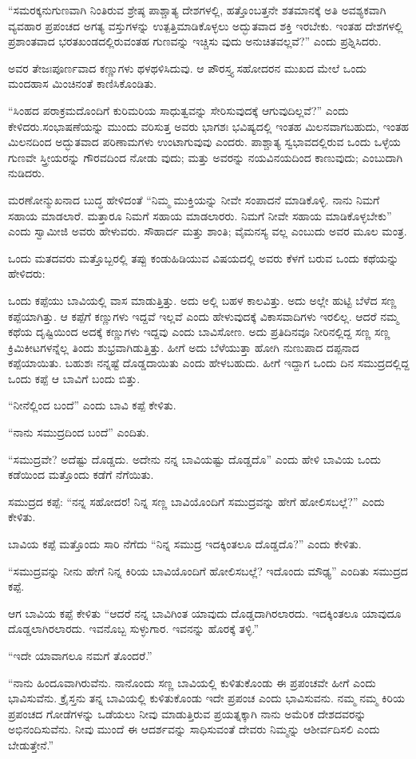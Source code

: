 “ಸಮರಕ್ಕನುಗುಣವಾಗಿ ನಿಂತಿರುವ ಶ್ರೇಷ್ಠ ಪಾಶ್ಚಾತ್ಯ ದೇಶಗಳಲ್ಲಿ, ಹತ್ತೊಂಬತ್ತನೇ ಶತಮಾನಕ್ಕೆ ಅತಿ ಅವಶ್ಯಕವಾಗಿ ವ್ಯವಹಾರ ಪ್ರಪಂಚದ ಅಗತ್ಯ ವಸ್ತುಗಳನ್ನು ಉತ್ಪತ್ತಿಮಾಡಿಕೊಳ್ಳಲು ಅದ್ಭುತವಾದ ಶಕ್ತಿ ಇರಬೇಕು. ಇಂತಹ ದೇಶಗಳಲ್ಲಿ ಪ್ರಶಾಂತವಾದ ಭರತಖಂಡದಲ್ಲಿರುವಂತಹ ಗುಣವನ್ನು ಇಚ್ಚಿಸು ವುದು ಅನುಚಿತವಲ್ಲವೆ?” ಎಂದು ಪ್ರಶ್ನಿಸಿದರು.

ಅವರ ತೇಜಃಪೂರ್ಣವಾದ ಕಣ್ಣುಗಳು ಥಳಥಳಿಸಿದುವು. ಆ ಪೌರಸ್ತ್ಯ ಸಹೋದರನ ಮುಖದ ಮೇಲೆ ಒಂದು ಮಂದಹಾಸ ಮಿಂಚಿನಂತೆ ಕಾಣಿಸಿಕೊಂಡಿತು.

“ಸಿಂಹದ ಪರಾಕ್ರಮದೊಂದಿಗೆ ಕುರಿಮರಿಯ ಸಾಧುತ್ವವನ್ನು ಸೇರಿಸುವುದಕ್ಕೆ ಆಗುವುದಿಲ್ಲವೆ?” ಎಂದು ಕೇಳಿದರು.ಸಂಭಾಷಣೆಯನ್ನು ಮುಂದು ವರಿಸುತ್ತ ಅವರು ಭಾಗಶಃ ಭವಿಷ್ಯದಲ್ಲಿ ಇಂತಹ ಮಿಲನವಾಗಬಹುದು, ಇಂತಹ ಮಿಲನದಿಂದ ಅದ್ಭುತವಾದ ಪರಿಣಾಮಗಳು ಉಂಟಾಗುವುವು ಎಂದರು. ಪಾಶ್ಚಾತ್ಯ ಸ್ವಭಾವದಲ್ಲಿರುವ ಒಂದು ಒಳ್ಳೆಯ ಗುಣವೇ ಸ್ತ್ರೀಯರನ್ನು ಗೌರವದಿಂದ ನೋಡು ವುದು; ಮತ್ತು ಅವರನ್ನು ನಯವಿನಯದಿಂದ ಕಾಣುವುದು; ಎಂಬುದಾಗಿ ನುಡಿದರು.

ಮರಣೋನ್ಮುಖನಾದ ಬುದ್ಧ ಹೇಳಿದಂತೆ “ನಿಮ್ಮ ಮುಕ್ತಿಯನ್ನು ನೀವೇ ಸಂಪಾದನೆ ಮಾಡಿಕೊಳ್ಳಿ. ನಾನು ನಿಮಗೆ ಸಹಾಯ ಮಾಡಲಾರೆ. ಮತ್ತಾರೂ ನಿಮಗೆ ಸಹಾಯ ಮಾಡಲಾರರು. ನಿಮಗೆ ನೀವೇ ಸಹಾಯ ಮಾಡಿಕೊಳ್ಳಬೇಕು” ಎಂದು ಸ್ವಾಮೀಜಿ ಅವರು ಹೇಳುವರು. ಸೌಹಾರ್ದ ಮತ್ತು ಶಾಂತಿ; ವೈಮನಸ್ಯ ವಲ್ಲ ಎಂಬುದು ಅವರ ಮೂಲ ಮಂತ್ರ.

ಒಂದು ಮತದವರು ಮತ್ತೊಬ್ಬರಲ್ಲಿ ತಪ್ಪು ಕಂಡುಹಿಡಿಯುವ ವಿಷಯದಲ್ಲಿ ಅವರು ಕೆಳಗೆ ಬರುವ ಒಂದು ಕಥೆಯನ್ನು ಹೇಳಿದರು:

ಒಂದು ಕಪ್ಪೆಯು ಬಾವಿಯಲ್ಲಿ ವಾಸ ಮಾಡುತ್ತಿತ್ತು. ಅದು ಅಲ್ಲಿ ಬಹಳ ಕಾಲವಿತ್ತು. ಅದು ಅಲ್ಲೇ ಹುಟ್ಟಿ ಬೆಳೆದ ಸಣ್ಣ ಕಪ್ಪೆಯಾಗಿತ್ತು. ಆ ಕಪ್ಪೆಗೆ ಕಣ್ಣುಗಳು ಇದ್ದವೆ ಇಲ್ಲವೆ ಎಂದು ಹೇಳುವುದಕ್ಕೆ ವಿಕಾಸವಾದಿಗಳು ಇರಲಿಲ್ಲ. ಆದರೆ ನಮ್ಮ ಕಥೆಯ ದೃಷ್ಟಿಯಿಂದ ಅದಕ್ಕೆ ಕಣ್ಣುಗಳು ಇದ್ದವು ಎಂದು ಬಾವಿಸೋಣ. ಅದು ಪ್ರತಿದಿನವೂ ನೀರಿನಲ್ಲಿದ್ದ ಸಣ್ಣ ಸಣ್ಣ ಕ್ರಿಮಿಕೀಟಗಳನ್ನೆಲ್ಲ ತಿಂದು ಶುಭ್ರವಾಗಿಡುತ್ತಿತ್ತು. ಹೀಗೆ ಅದು ಬೆಳೆಯುತ್ತಾ ಹೋಗಿ ನುಣುಪಾದ ದಪ್ಪನಾದ ಕಪ್ಪೆಯಾಯಿತು. ಬಹುಶಃ ನನ್ನಷ್ಟೆ ದೊಡ್ಡದಾಯಿತು ಎಂದು ಹೇಳಬಹುದು. ಹೀಗೆ ಇದ್ದಾಗ ಒಂದು ದಿನ ಸಮುದ್ರದಲ್ಲಿದ್ದ ಒಂದು ಕಪ್ಪೆ ಆ ಬಾವಿಗೆ ಬಂದು ಬಿತ್ತು.

“ನೀನೆಲ್ಲಿಂದ ಬಂದೆ” ಎಂದು ಬಾವಿ ಕಪ್ಪೆ ಕೇಳಿತು.

“ನಾನು ಸಮುದ್ರದಿಂದ ಬಂದೆ” ಎಂದಿತು.

“ಸಮುದ್ರವೇ? ಅದೆಷ್ಟು ದೊಡ್ಡದು. ಅದೇನು ನನ್ನ ಬಾವಿಯಷ್ಟು ದೊಡ್ಡದೊ” ಎಂದು ಹೇಳಿ ಬಾವಿಯ ಒಂದು ಕಡೆಯಿಂದ ಮತ್ತೊಂದು ಕಡೆಗೆ ನೆಗೆಯಿತು.

ಸಮುದ್ರದ ಕಪ್ಪೆ: “ನನ್ನ ಸಹೋದರ! ನಿನ್ನ ಸಣ್ಣ ಬಾವಿಯೊಂದಿಗೆ ಸಮುದ್ರವನ್ನು ಹೇಗೆ ಹೋಲಿಸಬಲ್ಲೆ?” ಎಂದು ಕೇಳಿತು.

ಬಾವಿಯ ಕಪ್ಪೆ ಮತ್ತೊಂದು ಸಾರಿ ನೆಗೆದು “ನಿನ್ನ ಸಮುದ್ರ ಇದಕ್ಕಿಂತಲೂ ದೊಡ್ಡದೊ?” ಎಂದು ಕೇಳಿತು.

“ಸಮುದ್ರವನ್ನು ನೀನು ಹೇಗೆ ನಿನ್ನ ಕಿರಿಯ ಬಾವಿಯೊಂದಿಗೆ ಹೋಲಿಸಬಲ್ಲೆ? ಇದೊಂದು ಮೌಢ್ಯ” ಎಂದಿತು ಸಮುದ್ರದ ಕಪ್ಪೆ.

ಆಗ ಬಾವಿಯ ಕಪ್ಪೆ ಕೇಳಿತು “ಆದರೆ ನನ್ನ ಬಾವಿಗಿಂತ ಯಾವುದು ದೊಡ್ಡದಾಗಿರಲಾರದು. ಇದಕ್ಕಿಂತಲೂ ಯಾವುದೂ ದೊಡ್ಡಲಾಗಿರಲಾರದು. ಇವನೊಬ್ಬ ಸುಳ್ಳುಗಾರ. ಇವನನ್ನು ಹೊರಕ್ಕೆ ತಳ್ಳಿ.”

“ಇದೇ ಯಾವಾಗಲೂ ನಮಗೆ ತೊಂದರೆ.”

“ನಾನು ಹಿಂದೂವಾಗಿರುವೆನು. ನಾನೊಂದು ಸಣ್ಣ ಬಾವಿಯಲ್ಲಿ ಕುಳಿತುಕೊಂಡು ಈ ಪ್ರಪಂಚವೇ ಹೀಗೆ ಎಂದು ಭಾವಿಸುವೆನು. ಕ್ರೈಸ್ತನು ತನ್ನ ಬಾವಿಯಲ್ಲಿ ಕುಳಿತುಕೊಂಡು ಇದೇ ಪ್ರಪಂಚ ಎಂದು ಭಾವಿಸುವನು. ನಮ್ಮ ನಮ್ಮ ಕಿರಿಯ ಪ್ರಪಂಚದ ಗೋಡೆಗಳನ್ನು ಒಡೆಯಲು ನೀವು ಮಾಡುತ್ತಿರುವ ಪ್ರಯತ್ನಕ್ಕಾಗಿ ನಾನು ಅಮೆರಿಕ ದೇಶದವರನ್ನು ಅಭಿನಂದಿಸುವೆನು. ನೀವು ಮುಂದೆ ಈ ಆದರ್ಶವನ್ನು ಸಾಧಿಸುವಂತೆ ದೇವರು ನಿಮ್ಮನ್ನು ಆಶೀರ್ವದಿಸಲಿ ಎಂದು ಬೇಡುತ್ತೇನೆ.”

